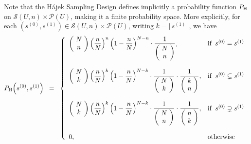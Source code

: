 \newcommand{\PKk}{\left(\!\begin{array}{c}N \\ k\end{array}\!\right)\left(\dfrac{n}{N}\right)^{k}\left(1 - \dfrac{n}{N}\right)^{N-k}}
\newcommand{\PKn}{\left(\!\begin{array}{c}N \\ n\end{array}\!\right)\left(\dfrac{n}{N}\right)^{n}\left(1 - \dfrac{n}{N}\right)^{N-n}}
\newcommand{\NCk}{\left(\!\begin{array}{c} N \\ k \end{array}\!\right)}
\newcommand{\NCn}{\left(\!\begin{array}{c} N \\ n \end{array}\!\right)}
\newcommand{\kCn}{\left(\!\begin{array}{c} k \\ n \end{array}\!\right)}
\newcommand{\nCk}{\left(\!\begin{array}{c} n \\ k \end{array}\!\right)}

\begin{remark}
\mbox{}
\vskip 0.1cm
\noindent
Note that the H\'ajek Sampling Design defines implicitly a probability function
$P_{\textnormal{H}}$ on $\mathcal{S}(U,n) \times \mathcal{P}(U)$,
making it a finite probability space.
More explicitly, for each $\left(s^{(0)},s^{(1)}\right) \in \mathcal{S}(U,n) \times \mathcal{P}(U)$,
writing $k = \vert\,s^{(1)}\,\vert$, we have
\begin{equation*}
P_{\textnormal{H}}\!\left(s^{(0)},s^{(1)}\right)
\;\; = \;\;
\left\{\begin{array}{ll}
\PKn\cdot\dfrac{1}{\NCn}, & \textnormal{if} \;\; s^{(0)} = s^{(1)}
\\ \\
\PKk\cdot\dfrac{1}{\NCk}\cdot\dfrac{1}{\kCn}, & \textnormal{if} \;\; s^{(0)} \subsetneq s^{(1)}
\\ \\
\PKk\cdot\dfrac{1}{\NCn}\cdot\dfrac{1}{\nCk}, & \textnormal{if} \;\; s^{(0)} \supsetneq s^{(1)}
\\ \\
0, & \textnormal{otherwise}
\end{array}\right.
\end{equation*}
\end{remark}

